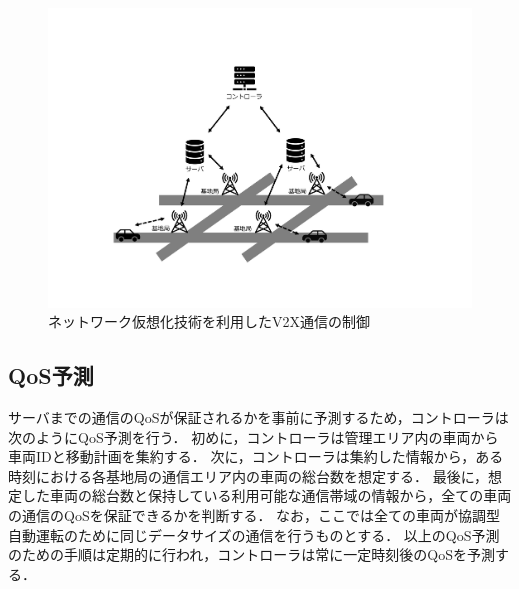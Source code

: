 \documentclass[a4paper,10pt,twocolumn,uplatex]{jsarticle}
\begin{document}
\begin{figure}[t]
	\begin{centering}
    \includegraphics[width=\linewidth]{img/ネットワーク仮想化技術を利用したV2X通信の制御.pdf}
    \caption{ネットワーク仮想化技術を利用したV2X通信の制御}
    \label{fig:NV}
    \end{centering}
\end{figure}

\subsection{QoS予測}
\label{QoSPrediction}
サーバまでの通信のQoSが保証されるかを事前に予測するため，コントローラは次のようにQoS予測を行う．
初めに，コントローラは管理エリア内の車両から車両IDと移動計画を集約する．
次に，コントローラは集約した情報から，ある時刻における各基地局の通信エリア内の車両の総台数を想定する．
最後に，想定した車両の総台数と保持している利用可能な通信帯域の情報から，全ての車両の通信のQoSを保証できるかを判断する．
なお，ここでは全ての車両が協調型自動運転のために同じデータサイズの通信を行うものとする．
以上のQoS予測のための手順は定期的に行われ，コントローラは常に一定時刻後のQoSを予測する．
\end{document}
